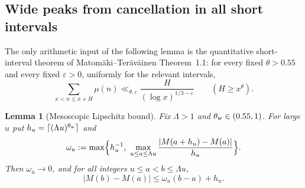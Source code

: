 \documentclass[11pt,reqno]{amsart}
\makeatletter
\let\CG@origcite\cite
\renewcommand*{\cite}[2][]{\def\CG@citekey{#2}%
  \ifx\relax#1\relax\CG@origcite{#2}\else\CG@origcite[#1]{#2}\fi}
\numberwithin{equation}{section}
\theoremstyle{plain}
\newtheorem{lemma}[theorem]{Lemma}
\theoremstyle{definition}
\theoremstyle{remark}
\makeatother
\begin{document}
\subsection{Wide peaks from cancellation in all short intervals}
\label{subsec:wide-peaks}

The only arithmetic input of the following lemma is the quantitative short-interval theorem of
Matom\"aki--Ter\"av\"ainen \cite[Theorem~1.1]{MatomakiTeravainen2023}: for every fixed
$\theta>0.55$ and every fixed $\varepsilon>0$, uniformly for the relevant intervals,
\begin{equation}
 \sum_{x<n\le x+H}\mu(n)
 \ll_{\theta,\varepsilon} \frac{H}{(\log x)^{1/3-\varepsilon}}
 \qquad(H\ge x^\theta).
\end{equation}

\begin{lemma}[Mesoscopic Lipschitz bound]
\label{lem:meso-lipschitz}
Fix $\Lambda>1$ and $\theta_{\rm w}\in(0.55,1)$. For large $u$ put
$h_u=\lceil(\Lambda u)^{\theta_{\rm w}}\rceil$ and
\begin{equation}
\omega_u:=\max\Bigl\{h_u^{-1},\ \max_{u\le a\le\Lambda u}
\frac{|M(a+h_u)-M(a)|}{h_u}\Bigr\}.
\end{equation}
Then $\omega_u\to0$, and for all integers $u\le a<b\le\Lambda u$,
\begin{equation}
\label{eq:meso-lipschitz}
|M(b)-M(a)|\le\omega_u(b-a)+h_u .
\end{equation}
\end{lemma}
\end{document}
